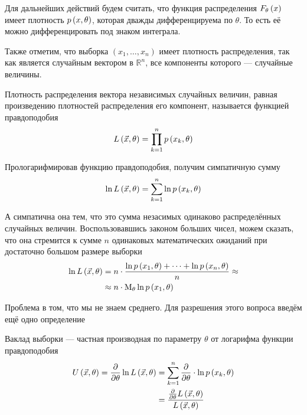 Для дальнейших действий будем считать,
что функция распределения $F_{\theta}\left(x\right)$ имеет плотность $p\left(x,\theta\right)$,
которая дважды дифференцируема по $\theta$.
То есть её можно дифференцировать под знаком интеграла.

Также отметим, что выборка $\left( x_1, \dots, x_n \right)$
имеет плотность распределения,
так как является случайным вектором в $\mathbb{R}^n$,
все компоненты которого --- случайные величины.

\begin{definition}
    Плотность распределения вектора независимых случайных величин,
    равная произведению плотностей распределения его компонент,
    называется функцией правдоподобия
    $$L\left( \vec{x},\theta \right)=\prod_{k=1}^np\left(x_k,\theta\right)$$
\end{definition}

Прологарифмировав функцию правдоподобия, получим симпатичную сумму
$$\ln{L\left( \vec{x},\theta \right)}=\sum_{k=1}^n\ln{p\left(x_k,\theta\right)}$$

А симпатична она тем,
что это сумма незасимых одинаково распределённых случайных величин.
Воспользовавшись законом больших чисел, можем сказать,
что она стремится к сумме $n$ одинаковых математических ожиданий
при достаточно большом размере выборки
\begin{align*}
    \ln{L\left( \vec{x},\theta \right)}
        &=n\cdot\frac{\ln{p\left(x_1,\theta\right)}+\dots+\ln{p\left(x_n,\theta\right)}}
            {n}\approx\\
        &\approx n\cdot\mathrm{M}_{\theta} \ln{p\left(x_1,\theta\right)}
\end{align*}

Проблема в том, что мы не знаем среднего.
Для разрешения этого вопроса введём ещё одно определение

\begin{definition}
    Ваклад выборки --- частная производная по параметру $\theta$
    от логарифма функции правдоподобия
    \begin{align*}
        U\left( \vec{x},\theta \right)
            =\frac{\partial}{\partial\theta}\ln{L\left(\vec{x},\theta\right)}
            &=\sum_{k=1}^n
                \frac{\partial}{\partial\theta}\cdot\ln{p\left(x_k,\theta\right)}\\
            &=\frac{\frac{\partial}{\partial\theta}L\left(\vec{x},\theta\right)}
                {L\left(\vec{x},\theta\right)}
    \end{align*}
\end{definition}


